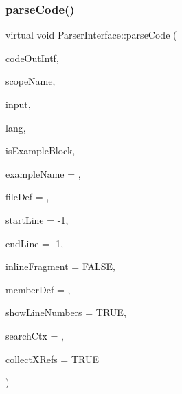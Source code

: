 \subsubsection{\texorpdfstring{parseCode()}{parseCode()}}
{\footnotesize\ttfamily virtual void Parser\+Interface\+::parse\+Code (\begin{DoxyParamCaption}\item[{\mbox{\hyperlink{class_code_output_interface}{Code\+Output\+Interface}} \&}]{code\+Out\+Intf,  }\item[{const char $\ast$}]{scope\+Name,  }\item[{const \mbox{\hyperlink{class_q_c_string}{Q\+C\+String}} \&}]{input,  }\item[{\mbox{\hyperlink{types_8h_a9974623ce72fc23df5d64426b9178bf2}{Src\+Lang\+Ext}}}]{lang,  }\item[{bool}]{is\+Example\+Block,  }\item[{const char $\ast$}]{example\+Name = {},  }\item[{\mbox{\hyperlink{class_file_def}{File\+Def}} $\ast$}]{file\+Def = {},  }\item[{int}]{start\+Line = {\ttfamily -\/1},  }\item[{int}]{end\+Line = {\ttfamily -\/1},  }\item[{bool}]{inline\+Fragment = {\ttfamily FALSE},  }\item[{\mbox{\hyperlink{class_member_def}{Member\+Def}} $\ast$}]{member\+Def = {},  }\item[{bool}]{show\+Line\+Numbers = {\ttfamily TRUE},  }\item[{\mbox{\hyperlink{class_definition}{Definition}} $\ast$}]{search\+Ctx = {},  }\item[{bool}]{collect\+X\+Refs = {\ttfamily TRUE} }\end{DoxyParamCaption})\hspace{0.3cm}{\ttfamily [pure virtual]}}

